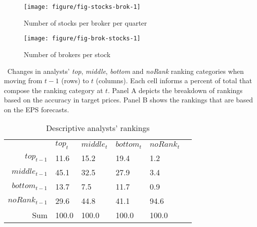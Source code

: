 \documentclass{article}\usepackage[]{graphicx}\usepackage[]{color}
\makeatletter
\def\maxwidth{ %
  \ifdim\Gin@nat@width>\linewidth
    \linewidth
  \else
    \Gin@nat@width
  \fi
}
\newenvironment{knitrout}{}{} %
\newcommand{\ra}[1]{\renewcommand{\arraystretch}{#1}}
\makeatother
\begin{document}
\begin{knitrout}
\color{fgcolor}\begin{figure}
\texttt{[image: figure/fig-stocks-brok-1]} \caption[Number of stocks per broker per quarter]{Number of stocks per broker per quarter\label{num-s-bfig-stocks-brok}}
\end{figure}


\end{knitrout}

\begin{knitrout}
\color{fgcolor}\begin{figure}
\texttt{[image: figure/fig-brok-stocks-1]} \caption[Number of brokers per stock]{Number of brokers per stock\label{num-b-sfig-brok-stocks}}
\end{figure}


\end{knitrout}


\begin{table}
\caption{Descriptive analysts' rankings}
\label{tab:top}
\ Changes in analysts' \emph{top}, \emph{middle}, \emph{bottom} and \emph{noRank} ranking categories when moving from $t-1$ (rows) to $t$ (columns). Each cell informs a percent of total that compose the ranking category at $t$. Panel A depicts the breakdown of rankings  based on the accuracy in target prices. Panel B shows the rankings that are based on the EPS forecasts.
\begin{center}
\begin{tabularx}{\linewidth}{r*{5}{Y}}
  \toprule
 & $top_{t}$ & $middle_{t}$ & $bottom_{t}$ & $noRank_{t}$ \\ 
 $top_{t-1}$ & 11.6 & 15.2 & 19.4 & 1.2 \\ 
  $middle_{t-1}$ & 45.1 & 32.5 & 27.9 & 3.4 \\ 
  $bottom_{t-1}$ & 13.7 & 7.5 & 11.7 & 0.9 \\ 
  $noRank_{t-1}$ & 29.6 & 44.8 & 41.1 & 94.6 \\ 
  Sum & 100.0 & 100.0 & 100.0 & 100.0 \\ 
  
\bottomrule
\end{tabularx}
\end{center}
\end{table}
\end{document}
